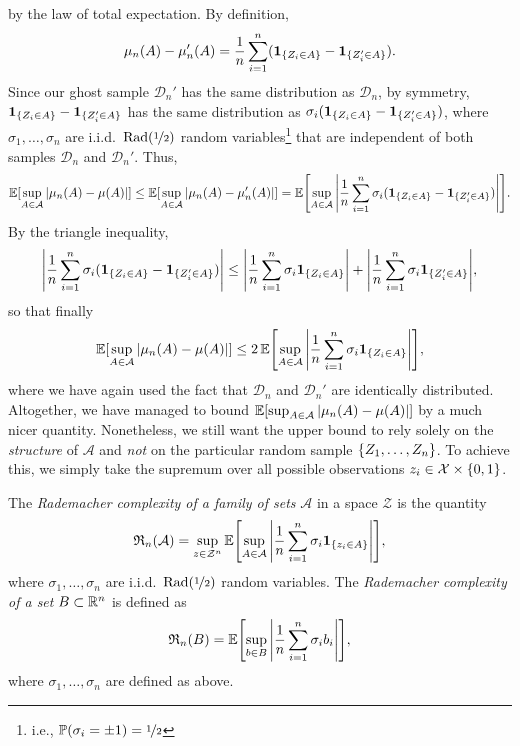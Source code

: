 by the law of total expectation. By definition,
\[
    \mu_n(A) - \mu_n'(A) = \frac{1}{n} \sum_{i=1}^n (\indSet{Z_i \in A} - \ind{\{Z_i' \in A\}}).
\]
Since our ghost sample $\mathcal{D}_n'$ has the same distribution as $\mathcal{D}_n$, by symmetry, $\indSet{Z_i \in A} - \ind{\{Z_i' \in A\}}$ has the same distribution as $\sigma_i (\indSet{Z_i \in A} - \ind{\{Z_i' \in A\}})$, where $\sigma_1, \dots, \sigma_n$ are i.i.d.\ $\Rad(\nicefrac{1}{2})$ random variables\footnote{i.e., $\P(\sigma_i = \pm 1) = \nicefrac{1}{2}$} that are independent of both samples $\mathcal{D}_n$ and $\mathcal{D}_n'$. Thus,
\[
    \Exp[\sup_{A \in \mathcal{A}} \abs{\mu_n(A) - \mu(A)}] \leq \Exp[\sup_{A \in \mathcal{A}} \abs*{\mu_n(A) - \mu_n'(A)}] = \Exp\left[\sup_{A \in \mathcal{A}} \abs{\frac{1}{n} \sum_{i=1}^n \sigma_i (\indSet{Z_i \in A} - \ind{\{Z_i' \in A\}})}\right].
\]
By the triangle inequality,
\[
    \abs{\frac{1}{n} \sum_{i=1}^n \sigma_i (\indSet{Z_i \in A} - \ind{\{Z_i' \in A\}}) } \leq \abs{\frac{1}{n} \sum_{i=1}^n \sigma_i \indSet{Z_i \in A}} + \abs{\frac{1}{n} \sum_{i=1}^n \sigma_i \ind{\{Z_i' \in A\}}},
\]
so that finally
\begin{equation}
\label{eq: precursor to symmetrization bound}
    \Exp[\sup_{A \in \mathcal{A}} \abs{\mu_n(A) - \mu(A)}] \leq 2 \Exp\left[\sup_{A \in \mathcal{A}} \abs{\frac{1}{n} \sum_{i=1}^n \sigma_i \indSet{Z_i \in A}}\right],
\end{equation}
where we have again used the fact that $\mathcal{D}_n$ and $\mathcal{D}_n'$ are identically distributed. Altogether, we have managed to bound $\Exp[\sup_{A \in \mathcal{A}} \abs{\mu_n(A) - \mu(A)}]$ by a much nicer quantity. Nonetheless, we still want the upper bound to rely solely on the \emph{structure} of $\mathcal{A}$ and \emph{not} on the particular random sample $\set{Z_1, \dots, Z_n}$. To achieve this, we simply take the supremum over all possible observations $z_i \in \mathcal{X} \times \set{0, 1}$.

\begin{definition}
The \emph{Rademacher complexity of a family of sets} $\mathcal{A}$ in a space $\mathcal{Z}$ is the quantity
\[
    \mathfrak{R}_n(\mathcal{A}) = \sup_{z \in \mathcal{Z}^n} \Exp\left[\sup_{A \in \mathcal{A}} \abs{\frac{1}{n} \sum_{i=1}^n \sigma_i \indSet{z_i \in A}}\right],
\]
where $\sigma_1, \dots, \sigma_n$ are i.i.d.\ $\Rad(\nicefrac{1}{2})$ random variables. The \emph{Rademacher complexity of a set} $B \subset \R^n$ is defined as 
\[
    \mathfrak{R}_n(B) = \Exp\left[\sup_{b \in B} \abs{\frac{1}{n} \sum_{i=1}^n \sigma_i b_i}\right],
\]
where $\sigma_1, \dots, \sigma_n$ are defined as above.
\end{definition}


